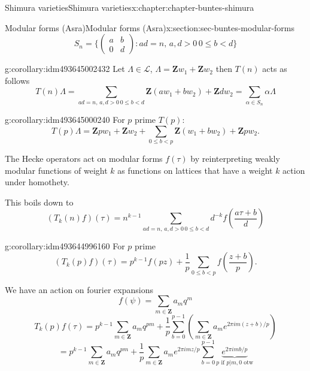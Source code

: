 \documentclass[oneside,10pt,]{book}
\numberwithin{equation}{section}
\newcommand{\ZZ}{\mathbf{Z}}
\newcommand{\lt}{<}
\newcommand{\gt}{>}
\newcommand{\amp}{&}
\begin{document}
\begin{chapterptx}{Shimura varieties}{}{Shimura varieties}{}{}{x:chapter:chapter-buntes-shimura}
\begin{sectionptx}{Modular forms (Asra)}{}{Modular forms (Asra)}{}{}{x:section:sec-buntes-modular-forms}
\begin{equation*}
S_n = \{\begin{pmatrix} a\amp b \\ 0 \amp d\end{pmatrix} : ad= n,\, a,d\gt 0\, 0\le b \lt d\}
\end{equation*}
%
\begin{corollary}{}{}{g:corollary:idm493645002432}%
Let \(\Lambda \in \mathcal L\), \(\Lambda = \ZZ w_1 + \ZZ w_2\) then  \(T(n)\) acts as follows%
\begin{equation*}
T(n) \Lambda =  \sum_{ ad= n,\, a,d\gt 0\, 0\le b \lt d} \ZZ(aw_1 + bw_2) + \ZZ dw_2 = \sum_{\alpha \in S_n} \alpha \Lambda
\end{equation*}
%
\end{corollary}
\begin{corollary}{}{}{g:corollary:idm493645000240}%
For \(p \) prime \(T(p)\):%
\begin{equation*}
T(p) \Lambda = \ZZ pw_1 + \ZZ w_2 +\sum_{0 \le b \lt p} \ZZ(w_1 + bw_2) + \ZZ pw_2\text{.}
\end{equation*}
%
\end{corollary}
The Hecke operators act on modular forms \(f(\tau)\) by reinterpreting weakly modular functions of weight \(k\) as functions on lattices that have  a weight \(k\) action under homothety.%
\par
This boils down to%
\begin{equation*}
(T_k(n) f)(\tau) = n^{k-1}  \sum_{ ad= n,\, a,d\gt 0\, 0\le b \lt d} d^{-k} f\left( \frac{ a\tau +b}{d}\right)
\end{equation*}
%
\begin{corollary}{}{}{g:corollary:idm493644996160}%
For \(p \) prime%
\begin{equation*}
(T_k(p) f)(\tau) = p^{k-1}f(pz) +\frac 1p \sum_{0 \le b  \lt p} f\left( \frac {z + b}{p} \right)\text{.}
\end{equation*}
%
\end{corollary}
We have an action on fourier expansions%
\begin{equation*}
f(\psi) = \sum_{m\in \ZZ} a_m q^m
\end{equation*}
%
\begin{equation*}
T_k(p)f(\tau) = p^{k-1} \sum_{m\in \ZZ} a_m q^{pm} + \frac{1}{p} \sum_{b=0}^{p-1}  \left( \sum_{m\in \ZZ} a_m e^{2\pi i m (z+b)/p}\right)
\end{equation*}
%
\begin{equation*}
= p^{k-1} \sum_{m\in \ZZ} a_m q^{pm} + \frac{1}{p}  \sum_{m\in \ZZ} a_me^{2\pi i m z/p} \sum_{b=0}^{p-1} \underbrace{e^{2\pi i m b/p}}_{p\text{ if }p|m,0\text{ otw}}

\end{equation*}
\end{sectionptx}
\end{chapterptx}
\end{document}
